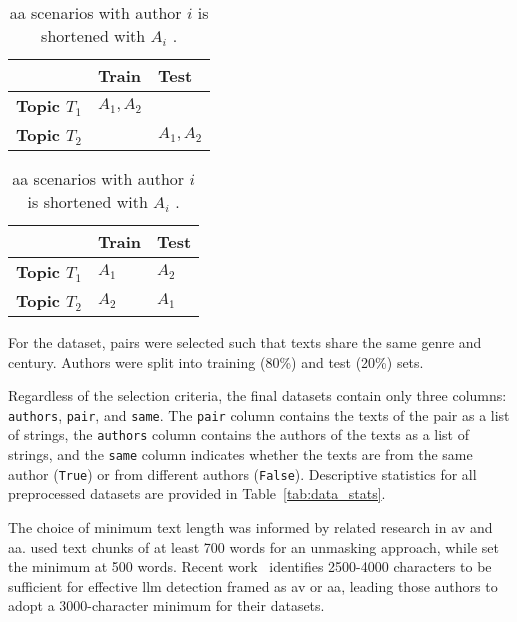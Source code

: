 \begin{table}[tbp]
    \centering
    \caption{\ac{aa} scenarios with author $i$ is shortened with $A_i$ \citep{altakrori_topic_2021}.}
    \label{tab:aa_cross_topic}
    \begin{tabular}{|l|l|l|}
    \hline
    \textbf{} & \textbf{Train} & \textbf{Test} \\ \hline
    \textbf{Topic $T_1$} & $A_1, A_2$ &  \\ \hline
    \textbf{Topic $T_2$} &  & $A_1, A_2$ \\ \hline
    \end{tabular}%
\end{table}

\begin{table}[tbp]
    \centering
    \caption{\ac{aa} scenarios with author $i$ is shortened with $A_i$ \citep{altakrori_topic_2021}.}
    \label{tab:aa_topic_confusion}
    \begin{tabular}{|l|l|l|}
    \hline
    \textbf{} & \textbf{Train} & \textbf{Test} \\ \hline
    \textbf{Topic $T_1$} & $A_1$ & $A_2$ \\ \hline
    \textbf{Topic $T_2$} & $A_2$ & $A_1$ \\ \hline
    \end{tabular}%
\end{table}


For the \dataGutenberg{} dataset, pairs were selected such that texts share the same genre and century. 
Authors were split into training (80\%) and test (20\%) sets.

Regardless of the selection criteria, the final datasets contain only three columns: \texttt{authors}, \texttt{pair}, and \texttt{same}.
The \texttt{pair} column contains the texts of the pair as a list of strings,
the \texttt{authors} column contains the authors of the texts as a list of strings,
and the \texttt{same} column indicates whether the texts are from the same author (\texttt{True}) or from different authors (\texttt{False}).
Descriptive statistics for all preprocessed datasets are provided in Table~\ref{tab:data_stats}.

The choice of minimum text length was informed by related research in \ac{av} and \ac{aa}.
\citet{bevendorff_generalizing_2019}used text chunks of at least 700 words for an unmasking approach, while \citet{koppel_authorship_2004} set the minimum at 500 words.
Recent work~\citep{llm_detection_av_2025} identifies \num{2500}-\num{4000} characters to be sufficient for effective \ac{llm} detection framed as \ac{av} or \ac{aa}, leading those authors to adopt a \num{3000}-character minimum for their datasets.

